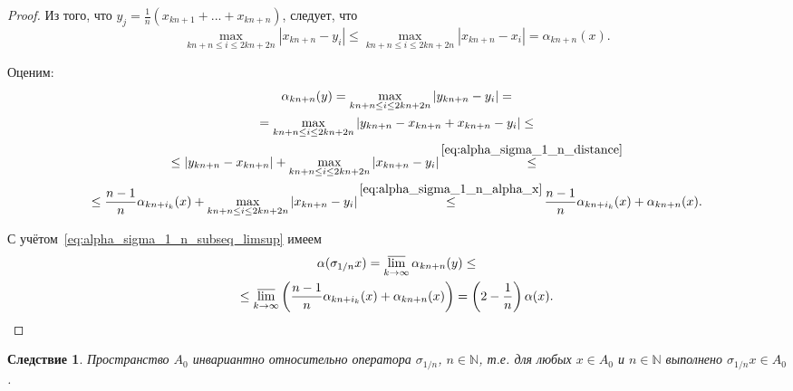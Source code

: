 \documentclass[a4paper,14pt]{article} %
\theoremstyle{plain}
\newtheorem{corollary}{Следствие}[lemma]
\begin{document}
\begin{proof}
	Из того, что $y_j = \frac{1}{n}(x_{kn+1}+...+x_{kn+n})$,
	следует, что
	\begin{equation}
		\label{eq:alpha_sigma_1_n_alpha_x}
		\max_{kn+n \leq i \leq 2kn+2n } |x_{kn+n} - y_i|
		\leq
		\max_{kn+n \leq i \leq 2kn+2n } |x_{kn+n} - x_i|
		=
		\alpha_{kn+n}(x)
		.
	\end{equation}

	Оценим:
	\begin{multline}
		\alpha_{kn+n}(y)
		=
		\max_{kn+n \leq i \leq 2kn+2n } |y_{kn+n} - y_i|
		=
		\\=
		\max_{kn+n \leq i \leq 2kn+2n } |y_{kn+n} - x_{kn+n} + x_{kn+n} - y_i|
		\leq
		\\\leq
		|y_{kn+n} - x_{kn+n}| + \max_{kn+n \leq i \leq 2kn+2n } |x_{kn+n} - y_i|
		\mathop{\leq}^{\eqref{eq:alpha_sigma_1_n_distance}}
		\\\leq
		\frac{n-1}{n} \alpha_{kn+i_k}(x) + \max_{kn+n \leq i \leq 2kn+2n } |x_{kn+n} - y_i|
		\mathop{\leq}^{\eqref{eq:alpha_sigma_1_n_alpha_x}}
		\frac{n-1}{n} \alpha_{kn+i_k}(x)+\alpha_{kn+n}(x)
		.
	\end{multline}

	С учётом~\eqref{eq:alpha_sigma_1_n_subseq_limsup} имеем
	\begin{multline}
		\alpha(\sigma_{1/n}x)
		=
		\varlimsup_{k\to\infty} \alpha_{kn+n}(y)
		\leq
		\\\leq
		\varlimsup_{k\to\infty} \left( \frac{n-1}{n} \alpha_{kn+i_k}(x)+\alpha_{kn+n}(x) \right)
		=
		\left(2-\frac{1}{n}\right)\alpha(x)
		.
	\end{multline}
\end{proof}

\begin{corollary}
	Пространство $A_0$ инвариантно относительно оператора $\sigma_{1/n}$,
	$n\in\mathbb{N}$,
	т.е. для любых $x\in A_0$ и $n\in\mathbb{N}$ выполнено $\sigma_{1/n} x\in A_0$.
\end{corollary}
\end{document}
